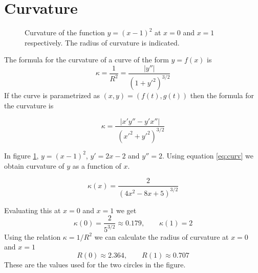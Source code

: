 
\section{Curvature}

\begin{figure}[h]
\begin{center}
\caption{\small Curvature of the function $y=(x-1)^2$ at $x=0$ and $x=1$ respectively. The radius of curvature is indicated. }
\label{fig-curvature}
\end{center}
\end{figure}

The formula for the curvature of a curve of the form $y=f(x)$ is
\begin{equation}
  \kappa=\frac{1}{R^2} = \frac{|y''|}{(1+y'^2)^{3/2}} \label{eq:curv}
\end{equation}
If the curve is parametrized as $(x,y)=(f(t),g(t))$ then the formula
for the curvature is 

\begin{equation}
  \kappa=\frac{|x'y''-y'x''|}{\;(x'^2+y'^2)^{3/2}} 
\end{equation}



\myhrule
\begin{myex}
In figure \ref{fig-curvature}, $y=(x-1)^2$, $y'=2x-2$ and $y''=2$. Using 
equation \ref{eq:curv} we obtain curvature of $y$ as a function of $x$.

$$
\kappa(x) = \frac{2}{(4x^2-8x+5)^{3/2}}
$$

Evaluating this at $x=0$ and $x=1$ we get
$$
  \kappa(0)=\frac{2}{5^{3/2}}\approx 0.179 , \qquad \kappa(1)=2
$$
Using the relation $\kappa=1/R^2$ we can calculate the radius of curvature
at $x=0$ and $x=1$
$$
  R(0)\approx 2.364 , \qquad R(1)\approx 0.707
$$
These are the values used for the two circles in the figure.
\end{myex}

